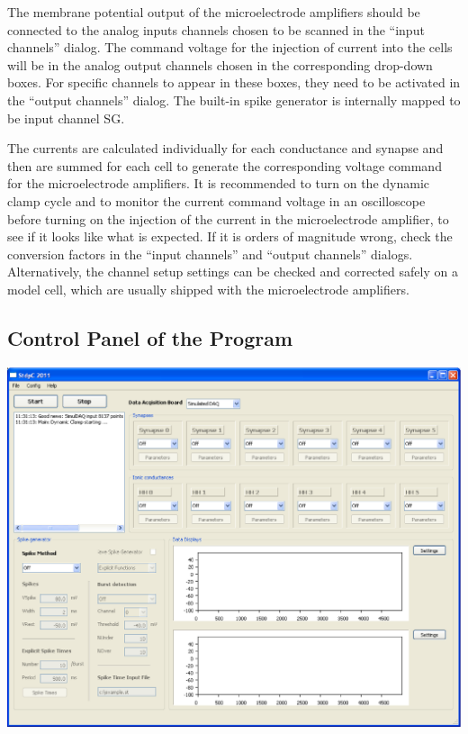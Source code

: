 \documentclass{article}
\begin{document}
The membrane potential output of the microelectrode amplifiers should
be connected to the analog inputs channels chosen to be scanned in the
``input channels'' dialog. The command voltage for the injection of
current into the cells will be in the analog output channels chosen in
the corresponding drop-down boxes. For specific channels to appear in
these boxes, they need to be activated in the ``output channels''
dialog. The built-in spike generator is internally mapped to be input
channel SG. 

The currents are calculated individually for each conductance and
synapse and then are summed for each cell to generate the
corresponding voltage command for the microelectrode amplifiers. It is
recommended to turn on the dynamic clamp cycle and to monitor the
current command voltage in an oscilloscope before turning on the
injection of the current in the microelectrode amplifier, to see if it
looks like what is expected. If it is orders of magnitude wrong, check
the conversion factors in the ``input channels'' and ``output
channels'' dialogs. Alternatively, the channel setup settings can be checked and
corrected safely on a model cell, which are usually shipped with the
microelectrode amplifiers.

 
\subsection{Control Panel of the Program}

\parbox{\textwidth}{
  \includegraphics[width=\textwidth]{main}
}
\vspace*{0.5cm}
\end{document}
